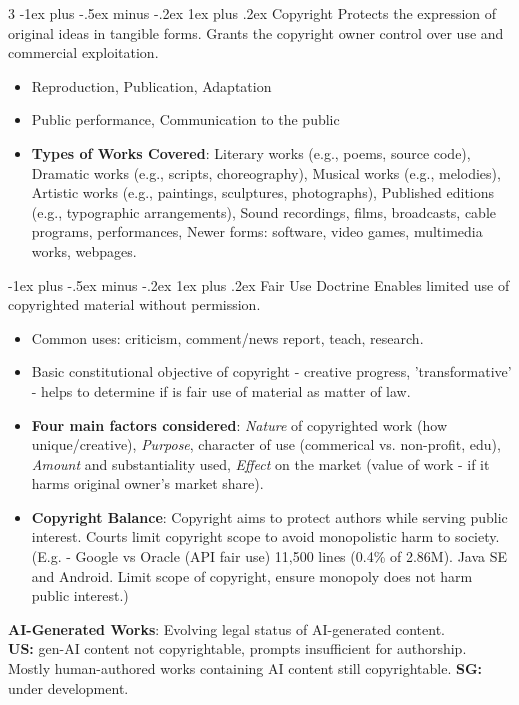 \documentclass[10pt, landscape]{article}
\makeatletter
\renewcommand{\subsubsection}{\@startsection{subsubsection}{3}{0mm}%
                                {-1ex plus -.5ex minus -.2ex}%
                                {1ex plus .2ex}%
                                {\normalfont\small\bfseries}}
\makeatother
\begin{document}
\begin{multicols*}{3}
\subsubsection{Copyright}
Protects the expression of original ideas in tangible forms. Grants the copyright owner control over use and commercial exploitation.
\begin{itemize}
	\item Reproduction, Publication, Adaptation
       \item Public performance, Communication to the public
	\item \textbf{Types of Works Covered}: Literary works (e.g., poems, source code), Dramatic works (e.g., scripts, choreography), Musical works (e.g., melodies), Artistic works (e.g., paintings, sculptures, photographs), Published editions (e.g., typographic arrangements), Sound recordings, films, broadcasts, cable programs, performances, Newer forms: software, video games, multimedia works, webpages.
\end{itemize}

\subsubsection{Fair Use Doctrine}
 Enables limited use of copyrighted material without permission.
\begin{itemize}[itemsep=-1pt]
    \item Common uses: criticism, comment/news report, teach, research.
    \item Basic constitutional objective of copyright - creative progress, 'transformative' - helps to determine if is fair use of material as matter of law. 
    \item \textbf{Four main factors considered}: \textit{Nature} of copyrighted work (how unique/creative), \textit{Purpose}, character of use (commerical vs. non-profit, edu), \textit{Amount} and substantiality used, \textit{Effect} on the market (value of work - if it harms original owner's market share).
    \item \textbf{Copyright Balance}: Copyright aims to protect authors while serving public interest. Courts limit copyright scope to avoid monopolistic harm to society. (E.g. - Google vs Oracle (API fair use) 11,500 lines (0.4\% of 2.86M). Java SE and Android. Limit scope of copyright, ensure monopoly does not harm public interest.)
\end{itemize}

\textbf{AI-Generated Works}: Evolving legal status of AI-generated content. \\
\textbf{US:} gen-AI content not copyrightable, prompts insufficient for authorship. Mostly human-authored works containing AI content still copyrightable. \textbf{SG:} under development.


\end{multicols*}
\end{document}
